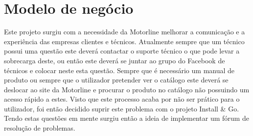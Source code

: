 \section{Modelo de negócio}

Este projeto surgiu com a necessidade da Motorline melhorar a comunicação e a experiência das 
empresas clientes e técnicos. 
Atualmente sempre que um técnico possui uma questão este deverá contactar o suporte técnico o que pode 
levar a sobrecarga deste, ou então este deverá se juntar ao grupo do Facebook de técnicos e colocar 
neste esta questão. Sempre que é necessário um manual de produto ou sempre que o utilizador pretender ver 
o catálogo este deverá se deslocar ao site da Motorline e procurar o produto no catálogo não possuindo um
acesso rápido a estes.
Visto que este processo acaba por não ser prático para o utilizador, foi então 
decidido suprir este problema com o projeto Install \& Go. Tendo estas questões em mente surgiu então 
a ideia de implementar um fórum de resolução de problemas.
